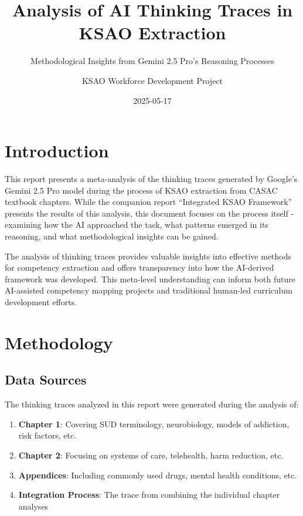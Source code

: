 \documentclass[
  letterpaper,
  DIV=11,
  numbers=noendperiod]{scrartcl}
\title{Analysis of AI Thinking Traces in KSAO Extraction}
\subtitle{Methodological Insights from Gemini 2.5 Pro's Reasoning
Processes}
\author{KSAO Workforce Development Project}
\date{2025-05-17}
\providecommand{\tightlist}{%
  \setlength{\itemsep}{0pt}\setlength{\parskip}{0pt}}
\renewcommand*\contentsname{Table of contents}
\newcommand\contentsname{Table of contents}
\begin{document}
\maketitle

\renewcommand*\contentsname{Table of contents}
{
\hypersetup{linkcolor=}
\setcounter{tocdepth}{3}
\tableofcontents
}

\section{Introduction}\label{introduction}

This report presents a meta-analysis of the thinking traces generated by
Google's Gemini 2.5 Pro model during the process of KSAO extraction from
CASAC textbook chapters. While the companion report ``Integrated KSAO
Framework'' presents the results of this analysis, this document focuses
on the process itself - examining how the AI approached the task, what
patterns emerged in its reasoning, and what methodological insights can
be gained.

The analysis of thinking traces provides valuable insights into
effective methods for competency extraction and offers transparency into
how the AI-derived framework was developed. This meta-level
understanding can inform both future AI-assisted competency mapping
projects and traditional human-led curriculum development efforts.

\section{Methodology}\label{methodology}

\subsection{Data Sources}\label{data-sources}

The thinking traces analyzed in this report were generated during the
analysis of:

\begin{enumerate}
\def\labelenumi{\arabic{enumi}.}
\tightlist
\item
  \textbf{Chapter 1}: Covering SUD terminology, neurobiology, models of
  addiction, risk factors, etc.
\item
  \textbf{Chapter 2}: Focusing on systems of care, telehealth, harm
  reduction, etc.
\item
  \textbf{Appendices}: Including commonly used drugs, mental health
  conditions, etc.
\item
  \textbf{Integration Process}: The trace from combining the individual
  chapter analyses
\end{enumerate}
\end{document}
